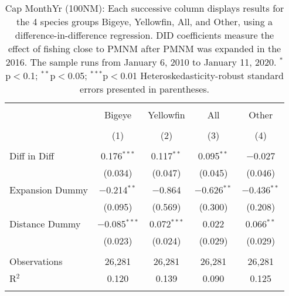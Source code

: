 
\begin{table}[!htbp] \centering 
  \caption{Cap MonthYr (100NM): Each successive column displays results for the 4 species groups Bigeye, Yellowfin, All, and Other, using a difference-in-difference regression. DID coefficients measure the effect of fishing close to PMNM after PMNM was expanded in the 2016. The sample runs from January 6, 2010 to January 11, 2020. $^{*}$p$<$0.1; $^{**}$p$<$0.05; $^{***}$p$<$0.01 Heteroskedasticity-robust standard errors presented in parentheses.} 
  \label{tbl:timeFE100NM} 
\begin{tabular}{@{\extracolsep{5pt}}lcccc} 
\\[-1.8ex]\hline 
\hline \\[-1.8ex] 
 & Bigeye & Yellowfin & All & Other \\ 
\\[-1.8ex] & (1) & (2) & (3) & (4)\\ 
\hline \\[-1.8ex] 
 Diff in Diff & 0.176$^{***}$ & 0.117$^{**}$ & 0.095$^{**}$ & $-$0.027 \\ 
  & (0.034) & (0.047) & (0.045) & (0.046) \\ 
  Expansion Dummy & $-$0.214$^{**}$ & $-$0.864 & $-$0.626$^{**}$ & $-$0.436$^{**}$ \\ 
  & (0.095) & (0.569) & (0.300) & (0.208) \\ 
  Distance Dummy & $-$0.085$^{***}$ & 0.072$^{***}$ & 0.022 & 0.066$^{**}$ \\ 
  & (0.023) & (0.024) & (0.029) & (0.029) \\ 
 \hline \\[-1.8ex] 
Observations & 26,281 & 26,281 & 26,281 & 26,281 \\ 
R$^{2}$ & 0.120 & 0.139 & 0.090 & 0.125 \\ 
\hline 
\hline \\[-1.8ex] 
\end{tabular} 
\end{table} 
